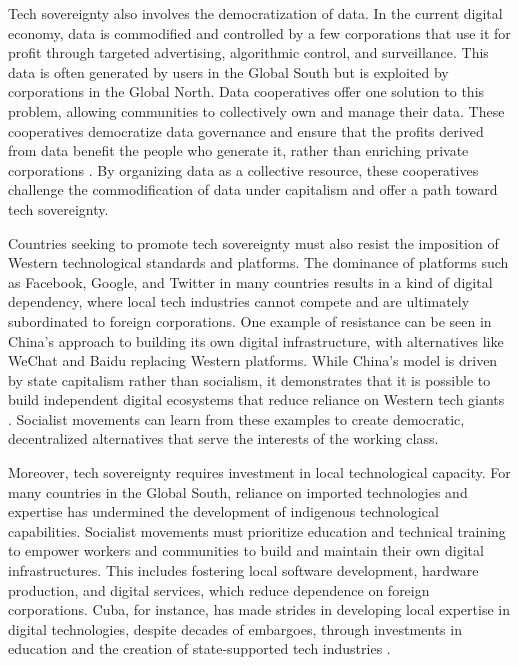 \begin{refsection}
Tech sovereignty also involves the democratization of data. In the current digital economy, data is commodified and controlled by a few corporations that use it for profit through targeted advertising, algorithmic control, and surveillance. This data is often generated by users in the Global South but is exploited by corporations in the Global North. Data cooperatives offer one solution to this problem, allowing communities to collectively own and manage their data. These cooperatives democratize data governance and ensure that the profits derived from data benefit the people who generate it, rather than enriching private corporations \cite[pp.~137-142]{morozov_data}. By organizing data as a collective resource, these cooperatives challenge the commodification of data under capitalism and offer a path toward tech sovereignty.

Countries seeking to promote tech sovereignty must also resist the imposition of Western technological standards and platforms. The dominance of platforms such as Facebook, Google, and Twitter in many countries results in a kind of digital dependency, where local tech industries cannot compete and are ultimately subordinated to foreign corporations. One example of resistance can be seen in China's approach to building its own digital infrastructure, with alternatives like WeChat and Baidu replacing Western platforms. While China’s model is driven by state capitalism rather than socialism, it demonstrates that it is possible to build independent digital ecosystems that reduce reliance on Western tech giants \cite[pp.~57-63]{chun_digital_sovereignty}. Socialist movements can learn from these examples to create democratic, decentralized alternatives that serve the interests of the working class.

Moreover, tech sovereignty requires investment in local technological capacity. For many countries in the Global South, reliance on imported technologies and expertise has undermined the development of indigenous technological capabilities. Socialist movements must prioritize education and technical training to empower workers and communities to build and maintain their own digital infrastructures. This includes fostering local software development, hardware production, and digital services, which reduce dependence on foreign corporations. Cuba, for instance, has made strides in developing local expertise in digital technologies, despite decades of embargoes, through investments in education and the creation of state-supported tech industries \cite[pp.~215-220]{feinberg_cuba}.


\end{refsection}
